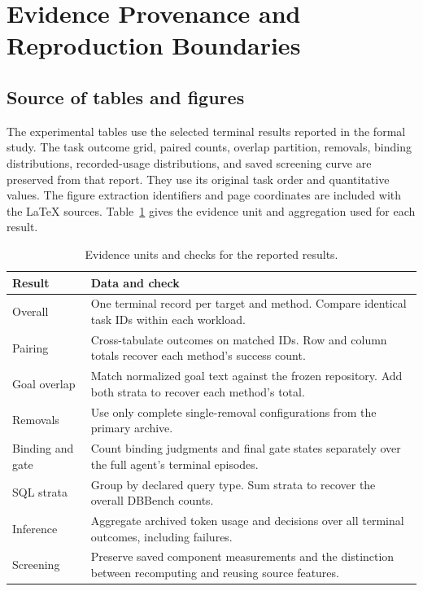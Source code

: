 \section{Evidence Provenance and Reproduction Boundaries}
\label{app:provenance}

\subsection{Source of tables and figures}
The experimental tables use the selected terminal results reported in the formal study. The task outcome grid, paired counts, overlap partition, removals, binding distributions, recorded-usage distributions, and saved screening curve are preserved from that report. They use its original task order and quantitative values. The figure extraction identifiers and page coordinates are included with the LaTeX sources. Table~\ref{tab:provenance} gives the evidence unit and aggregation used for each result.

\begin{table}[t]
  \caption{Evidence units and checks for the reported results.}
  \label{tab:provenance}
  \begin{tabularx}{\columnwidth}{@{}lX@{}}
    \toprule
    Result & Data and check \\
    \midrule
    Overall & One terminal record per target and method. Compare identical task IDs within each workload. \\
    Pairing & Cross-tabulate outcomes on matched IDs. Row and column totals recover each method's success count. \\
    Goal overlap & Match normalized goal text against the frozen repository. Add both strata to recover each method's total. \\
    Removals & Use only complete single-removal configurations from the primary archive. \\
    Binding and gate & Count binding judgments and final gate states separately over the full agent's terminal episodes. \\
    SQL strata & Group by declared query type. Sum strata to recover the overall DBBench counts. \\
    Inference & Aggregate archived token usage and decisions over all terminal outcomes, including failures. \\
    Screening & Preserve saved component measurements and the distinction between recomputing and reusing source features. \\
    \bottomrule
  \end{tabularx}
\end{table}

